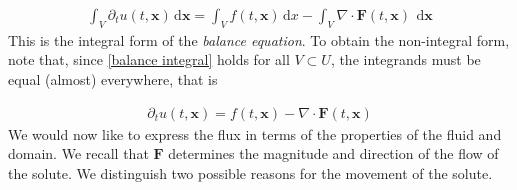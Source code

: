 \documentclass[
	a4paper,
	DIV=14,
	abstract=true,
	numbers=noenddot
]
{scrartcl}
\theoremstyle{definition}
\renewcommand{\d}{\,\mathrm{d}}\newcommand{\dx}{\,\mathrm{d}x}\newcommand{\dy}{\,\mathrm{d}y}
\begin{document}
\begin{align}\label{balance integral}
	\int_{V}\partial _t u(t,\bm{x} )  \d \bm{x} = \int_{V}f(t,\bm{x} ) \d x -\int_{V}  \nabla \cdot  \bm{F}(t, \bm{x})\   \d  \bm{x}\end{align}
This is the integral form of the \emph{balance equation}. To obtain the non-integral form, note that, since \eqref{balance integral} holds for all $V \subset  U$, the integrands must be equal (almost) everywhere, that is

\begin{align}\label{balance}
	\partial _t u(t,\bm{x} )   = f(t,\bm{x})-\nabla \cdot  \bm{F}(t, \bm{x})\end{align}
We would now like to express the flux in terms of the properties of the fluid and domain. We recall that $\bm{F} $ determines the magnitude and direction of the flow of the solute. We distinguish two possible reasons for the movement of the solute.
\end{document}
